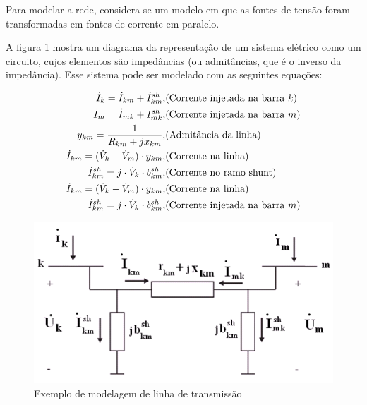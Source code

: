 Para modelar a rede, considera-se um modelo em que as fontes de tensão
foram transformadas em fontes de corrente em paralelo. %

A figura \ref{fig:modelagem-sistema} mostra um diagrama da representação
de um sistema elétrico como um circuito, cujos elementos são impedâncias
(ou admitâncias, que é o inverso da impedância). Esse sistema pode
ser modelado com as seguintes equações:

\[
\begin{aligned}\dot{I}_{k}=\dot{I}_{km}+\dot{I}_{km}^{sh}, & (\mbox{Corrente injetada na barra \ensuremath{k})}\\
\dot{I}_{m}=\dot{I}_{mk}+\dot{I}_{mk}^{sh}, & (\mbox{Corrente injetada na barra \ensuremath{m})}\\
y_{km}=\frac{1}{R_{km}+jx_{km}}, & (\mbox{Admitância da linha)}\\
\dot{I}_{km}=(\dot{V}_{k}-\dot{V}_{m})\cdot y_{km}, & (\mbox{Corrente na linha)}\\
\dot{I}_{km}^{sh}=j\cdot\dot{V}_{k}\cdot b_{km}^{sh}, & (\mbox{Corrente no ramo shunt)}\\
\dot{I}_{km}=(\dot{V}_{k}-\dot{V}_{m})\cdot y_{km}, & (\mbox{Corrente na linha)}\\
\dot{I}_{km}^{sh}=j\cdot\dot{V}_{k}\cdot b_{km}^{sh}, & (\mbox{Corrente injetada na barra \ensuremath{m})}
\end{aligned}
\]

\begin{figure}
\begin{centering}
\includegraphics{anexos/aula3_circuito2}
\par\end{centering}

\protect\caption{\label{fig:modelagem-sistema}Exemplo de modelagem de linha de transmissão}
\end{figure}


